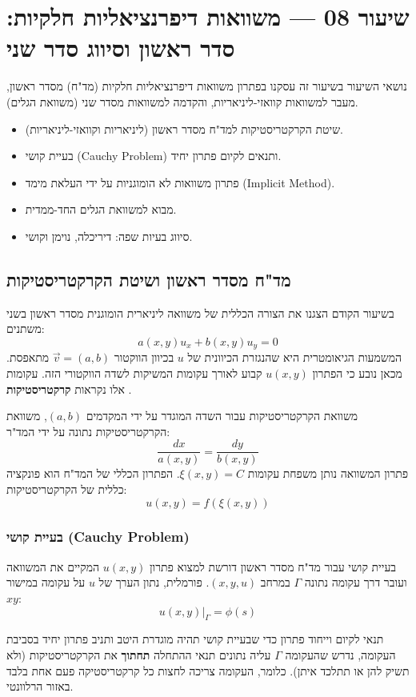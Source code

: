 \section{שיעור 08 — משוואות דיפרנציאליות חלקיות: סדר ראשון וסיווג סדר שני}

\begin{summarybox}{נושאי השיעור}
בשיעור זה עסקנו בפתרון משוואות דיפרנציאליות חלקיות (מד"ח) מסדר ראשון, מעבר למשוואות קוואזי-ליניאריות, והקדמה למשוואות מסדר שני (משוואת הגלים).
\begin{itemize}
    \item שיטת הקרקטריסטיקות למד"ח מסדר ראשון (ליניאריות וקוואזי-ליניאריות).
    \item בעיית קושי (Cauchy Problem) ותנאים לקיום פתרון יחיד.
    \item פתרון משוואות לא הומוגניות על ידי העלאת מימד (Implicit Method).
    \item מבוא למשוואת הגלים החד-ממדית.
    \item סיווג בעיות שפה: דיריכלה, נוימן וקושי.
\end{itemize}
\end{summarybox}

\subsection{מד"ח מסדר ראשון ושיטת הקרקטריסטיקות}

בשיעור הקודם הצגנו את הצורה הכללית של משוואה ליניארית הומוגנית מסדר ראשון בשני משתנים:
\[
a(x,y)u_x + b(x,y)u_y = 0
\]
המשמעות הגיאומטרית היא שהנגזרת הכיוונית של $u$ בכיוון הווקטור $\vec{v}=(a,b)$ מתאפסת. מכאן נובע כי הפתרון $u(x,y)$ קבוע לאורך עקומות המשיקות לשדה הווקטורי הזה. עקומות אלו נקראות \textbf{קרקטריסטיקות} .

\begin{definitionbox}{משוואת הקרקטריסטיקות}
עבור השדה המוגדר על ידי המקדמים $(a,b)$, משוואת הקרקטריסטיקות נתונה על ידי המד"ר:
\[
\frac{dx}{a(x,y)} = \frac{dy}{b(x,y)}
\]
פתרון המשוואה נותן משפחת עקומות $\xi(x,y) = C$. הפתרון הכללי של המד"ח הוא פונקציה כללית של הקרקטריסטיקות:
\[
u(x,y) = f(\xi(x,y))
\]
\end{definitionbox}

\subsubsection{בעיית קושי (Cauchy Problem)}
בעיית קושי עבור מד"ח מסדר ראשון דורשת למצוא פתרון $u(x,y)$ המקיים את המשוואה ועובר דרך עקומה נתונה $\Gamma$ במרחב $(x,y,u)$.
פורמלית, נתון הערך של $u$ על עקומה במישור $xy$:
\[
u(x,y)\big|_{\Gamma} = \phi(s)
\]
\begin{theorembox}{תנאי לקיום וייחוד פתרון}
כדי שבעיית קושי תהיה מוגדרת היטב ותניב פתרון יחיד בסביבת העקומה, נדרש שהעקומה $\Gamma$ עליה נתונים תנאי ההתחלה \textbf{תחתוך} את הקרקטריסטיקות (ולא תשיק להן או תתלכד איתן). כלומר, העקומה צריכה לחצות כל קרקטריסטיקה פעם אחת בלבד באזור הרלוונטי.
\end{theorembox}

